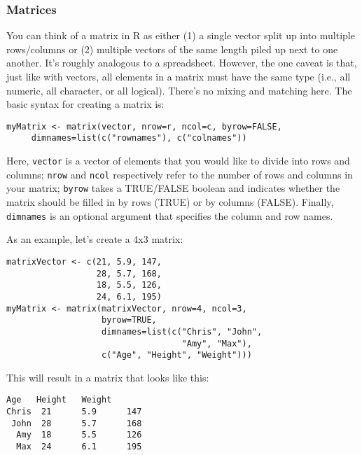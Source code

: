 \subsubsection{Matrices}
You can think of a matrix  in R as either (1) a single vector split up into multiple rows/columns or (2) multiple vectors of the same length piled up next to one another. It's roughly analogous to a spreadsheet. However, the one caveat is that, just like with vectors, all elements in a matrix must have the same type (i.e., all numeric, all character, or all logical). There's no mixing and matching here. The basic syntax for creating a matrix is:

\begin{framed}
\begin{Verbatim}[samepage=TRUE]
myMatrix <- matrix(vector, nrow=r, ncol=c, byrow=FALSE, 
     dimnames=list(c("rownames"), c("colnames"))
\end{Verbatim}
\end{framed}

Here, \verb|vector| is a vector of elements that you would like to divide into rows and columns; \verb|nrow| and \verb|ncol| respectively refer to the number of rows and columns in your matrix; \verb|byrow| takes a TRUE/FALSE boolean and indicates whether the matrix should be filled in by rows (TRUE) or by columns (FALSE). Finally, \verb|dimnames| is an optional argument that specifies the column and row names.

As an example, let's create a 4x3 matrix:

\begin{framed}
\begin{Verbatim}[samepage=TRUE]
matrixVector <- c(21, 5.9, 147,
                  28, 5.7, 168,
                  18, 5.5, 126,
                  24, 6.1, 195)
myMatrix <- matrix(matrixVector, nrow=4, ncol=3,
                   byrow=TRUE,
                   dimnames=list(c("Chris", "John",
                                   "Amy", "Max"),
                   c("Age", "Height", "Weight")))
\end{Verbatim}
\end{framed}

This will result in a matrix that looks like this:

\begin{framed}
\begin{Verbatim}[samepage=TRUE]
      Age   Height   Weight
Chris  21      5.9      147
 John  28      5.7      168
  Amy  18      5.5      126
  Max  24      6.1      195
\end{Verbatim}
\end{framed}

